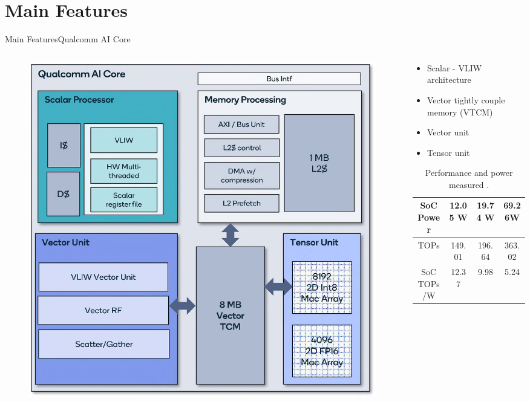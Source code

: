 \documentclass[12pt]{beamer}
\begin{document}
\section{Main Features}
\begin{frame}{Main Features}{Qualcomm AI Core}
    \begin{columns}
        \begin{column}{0.4\linewidth}
            \begin{figure}[H]
                \centering
                \includegraphics[width=0.8\columnwidth]{8.jpg}
            \end{figure}
        \end{column}
        \begin{column}{0.6\linewidth}
            \begin{itemize}
                \small
                \item Scalar - VLIW architecture
                \item Vector tightly couple memory (VTCM)
                \item Vector unit
                \item Tensor unit
            \end{itemize}
            \begin{table}[H]
                \centering
                \scriptsize
                \begin{tabular}{|c|c|c|c|}
                    \hline
                    SoC Power&12.05 W&19.74 W&69.26W\\
                    \hline
                    TOPs&149.01&196.64&363.02\\
                    \hline
                    SoC TOPs/W&12.37&9.98&5.24\\
                    \hline
                \end{tabular}
                \caption{Performance and power measured \cite{chatha2021qualcomm}.}
            \end{table}
        \end{column}
    \end{columns}
\end{frame}
\end{document}
